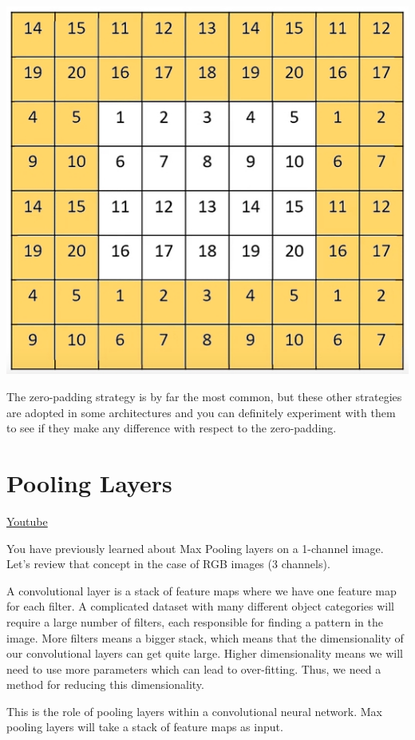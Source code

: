 \includegraphics[width=0.75\linewidth]{img//cnn//depth/circularpadding.jpeg}

The zero-padding strategy is by far the most common, but these other strategies are adopted in some architectures and you can definitely experiment with them to see if they make any difference with respect to the zero-padding.


\section{Pooling Layers}
\href{https://www.youtube.com/watch?v=zTQsln05VqA&ab_channel=Udacity}{Youtube}\newline

You have previously learned about Max Pooling layers on a 1-channel image. Let's review that concept in the case of RGB images (3 channels). \newline

A convolutional layer is a stack of feature maps where we have one feature map for each filter.
A complicated dataset with many different object categories will require a large number of filters, each responsible for finding a pattern in the image. More filters means a bigger stack, which means that the dimensionality of our convolutional layers can get quite large. Higher dimensionality means we will need to use more parameters which can lead to over-fitting. Thus, we need a method for reducing this dimensionality. \newline

This is the role of pooling layers within a convolutional neural network. Max pooling layers will take a stack of feature maps as input.

